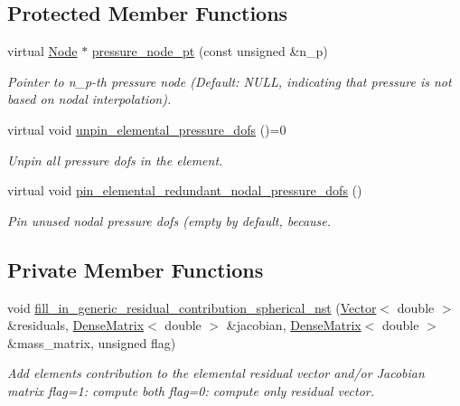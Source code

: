 \subsection*{Protected Member Functions}
\begin{DoxyCompactItemize}
\item 
virtual \hyperlink{classoomph_1_1Node}{Node} $\ast$ \hyperlink{classoomph_1_1RefineableSphericalNavierStokesEquations_a1daddea2d11bb46db3e6aef3843b288d}{pressure\+\_\+node\+\_\+pt} (const unsigned \&n\+\_\+p)
\begin{DoxyCompactList}\small\item\em Pointer to n\+\_\+p-\/th pressure node (Default\+: N\+U\+LL, indicating that pressure is not based on nodal interpolation). \end{DoxyCompactList}\item 
virtual void \hyperlink{classoomph_1_1RefineableSphericalNavierStokesEquations_a6d4b7f91dc9139367408a3b9f067920d}{unpin\+\_\+elemental\+\_\+pressure\+\_\+dofs} ()=0
\begin{DoxyCompactList}\small\item\em Unpin all pressure dofs in the element. \end{DoxyCompactList}\item 
virtual void \hyperlink{classoomph_1_1RefineableSphericalNavierStokesEquations_a0041d52514b3020466b88bc63a5f749a}{pin\+\_\+elemental\+\_\+redundant\+\_\+nodal\+\_\+pressure\+\_\+dofs} ()
\begin{DoxyCompactList}\small\item\em Pin unused nodal pressure dofs (empty by default, because. \end{DoxyCompactList}\end{DoxyCompactItemize}
\subsection*{Private Member Functions}
\begin{DoxyCompactItemize}
\item 
void \hyperlink{classoomph_1_1RefineableSphericalNavierStokesEquations_aaadda4a5dbffc1e23db2ac8b3dd86d4a}{fill\+\_\+in\+\_\+generic\+\_\+residual\+\_\+contribution\+\_\+spherical\+\_\+nst} (\hyperlink{classoomph_1_1Vector}{Vector}$<$ double $>$ \&residuals, \hyperlink{classoomph_1_1DenseMatrix}{Dense\+Matrix}$<$ double $>$ \&jacobian, \hyperlink{classoomph_1_1DenseMatrix}{Dense\+Matrix}$<$ double $>$ \&mass\+\_\+matrix, unsigned flag)
\begin{DoxyCompactList}\small\item\em Add element\textquotesingle{}s contribution to the elemental residual vector and/or Jacobian matrix flag=1\+: compute both flag=0\+: compute only residual vector. \end{DoxyCompactList}\end{DoxyCompactItemize}
